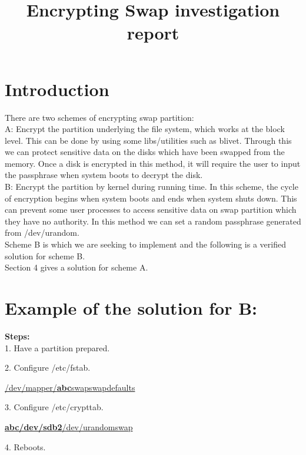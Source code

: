 \documentclass{article}
\begin{document}
\title{\textbf{Encrypting Swap investigation report}}
\maketitle
\section{Introduction}
There are two schemes of encrypting swap partition:\\

A: Encrypt the partition underlying the file system, which works at the block
level. This can be done by using some libs/utilities such as blivet. Through
this we can protect sensitive data on the disks which have been swapped from the
memory. Once a disk is encrypted in this method, it will require the user to
input the passphrase when system boots to decrypt the disk.\\

B: Encrypt the partition by kernel during running time. In this scheme, the
cycle of encryption begins when system boots and ends when system shuts down.
This can prevent some user processes to access sensitive data on swap partition
which they have no authority. In this method we can set a random passphrase
generated from /dev/urandom.\\

Scheme B is which we are seeking to implement and the following is a verified
solution for scheme B.\\

Section 4 gives a solution for scheme A.

\section{Example of the solution for B:}

\textbf{Steps:}\\

1. Have a partition prepared.

2. Configure /etc/fstab.

\qquad \underline{	/dev/mapper/\textbf{abc}\quad		swap\quad	swap\quad defaults\quad	0}

3. Configure /etc/crypttab.

\qquad \underline{	\textbf{abc}\quad	\textbf{/dev/sdb2}\quad	/dev/urandom\quad	swap}

4. Reboots. \\
\end{document}
